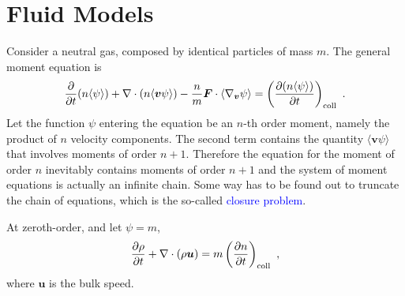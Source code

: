 \documentclass[12pt,a4paper]{article}
\renewcommand{\vec}[1]{\boldsymbol{#1}}
\begin{document}
\section{Fluid Models}
Consider a neutral gas, composed by identical particles of mass $m$. The general moment equation is
\begin{eqnarray}
\frac{\partial }{\partial t} (n\langle \psi \rangle) +\nabla\cdot (n\langle \vec{v} \psi \rangle) -\frac{n}{m} \vec{F} \cdot \langle \nabla_{\vec{v}} \psi \rangle = \left(\frac{\partial (n\langle \psi \rangle)}{\partial t} \right)_{\rm coll}  ~.
\end{eqnarray}
Let the function $\psi$ entering the equation be an $n$-th order moment, namely the product of $n$ velocity components. The second term contains the quantity $\langle \vec{v} \psi \rangle$ that involves moments of order $n+1$. Therefore the equation for the moment of order $n$ inevitably contains moments of order $n+1$ and the system of moment equations is actually an infinite chain. Some way has to be found out to truncate the chain of equations, which is the so-called \textcolor{blue}{closure problem}.

At zeroth-order, and let $\psi = m$, 
\begin{equation}
\frac{\partial \rho}{\partial t} +\nabla \cdot (\rho \vec{u}) = m\left(\frac{\partial n}{\partial t} \right)_{\rm coll} ~,
\end{equation}
where $\vec{u}$ is the bulk speed.
\end{document}
